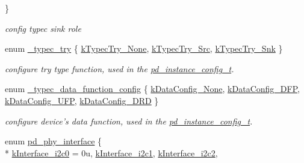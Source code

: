 \begin{DoxyCompactItemize}
 \}
\begin{DoxyCompactList}\small\item\em config typec sink role \end{DoxyCompactList}\item 
enum \hyperlink{group__usb__pd__stack_ga4794fa8903a011ba6f0be0f04925411e}{\-\_\-typec\-\_\-try} \{ \hyperlink{group__usb__pd__stack_gga4794fa8903a011ba6f0be0f04925411eaff14c5fbf053f7e1292cd753ca873a0f}{k\-Typec\-Try\-\_\-\-None}, 
\hyperlink{group__usb__pd__stack_gga4794fa8903a011ba6f0be0f04925411ea4326df028c06c1618941dfac6645decd}{k\-Typec\-Try\-\_\-\-Src}, 
\hyperlink{group__usb__pd__stack_gga4794fa8903a011ba6f0be0f04925411ea96a98ce2756ccbcd3c300db89ae9be67}{k\-Typec\-Try\-\_\-\-Snk}
 \}
\begin{DoxyCompactList}\small\item\em configure try type function, used in the \hyperlink{group__usb__pd__stack_gafa6034f9e204836697da1f2fc996cbad}{pd\-\_\-instance\-\_\-config\-\_\-t}. \end{DoxyCompactList}\item 
enum \hyperlink{group__usb__pd__stack_gacc3677fc21b76efa77ae5f744194394a}{\-\_\-typec\-\_\-data\-\_\-function\-\_\-config} \{ \hyperlink{group__usb__pd__stack_ggacc3677fc21b76efa77ae5f744194394aa0b6fd26639425a5f6b6eeaed540f3656}{k\-Data\-Config\-\_\-\-None}, 
\hyperlink{group__usb__pd__stack_ggacc3677fc21b76efa77ae5f744194394aa0ab32890019239bbad8863e42e90e827}{k\-Data\-Config\-\_\-\-D\-F\-P}, 
\hyperlink{group__usb__pd__stack_ggacc3677fc21b76efa77ae5f744194394aa4ca531bca1939ba6fbaaa1108afedfa8}{k\-Data\-Config\-\_\-\-U\-F\-P}, 
\hyperlink{group__usb__pd__stack_ggacc3677fc21b76efa77ae5f744194394aafe1a15a0a49245fe0d1a94e5ab062202}{k\-Data\-Config\-\_\-\-D\-R\-D}
 \}
\begin{DoxyCompactList}\small\item\em configure device's data function, used in the \hyperlink{group__usb__pd__stack_gafa6034f9e204836697da1f2fc996cbad}{pd\-\_\-instance\-\_\-config\-\_\-t}. \end{DoxyCompactList}\item 
enum \hyperlink{group__usb__pd__stack_ga4aed694f998da91dea8d218596d65c1e}{pd\-\_\-phy\-\_\-interface} \{ \\*
\hyperlink{group__usb__pd__stack_gga4aed694f998da91dea8d218596d65c1ea0e6fc11f3fbc9732619f2083042e7e17}{k\-Interface\-\_\-i2c0} = 0u, 
\hyperlink{group__usb__pd__stack_gga4aed694f998da91dea8d218596d65c1eaf78fb0f4bdd4db6e8a2e5dab05ba59d2}{k\-Interface\-\_\-i2c1}, 
\hyperlink{group__usb__pd__stack_gga4aed694f998da91dea8d218596d65c1ea7e08032b6509673dc643a7d01a5baec4}{k\-Interface\-\_\-i2c2}, 

\end{DoxyCompactItemize}
